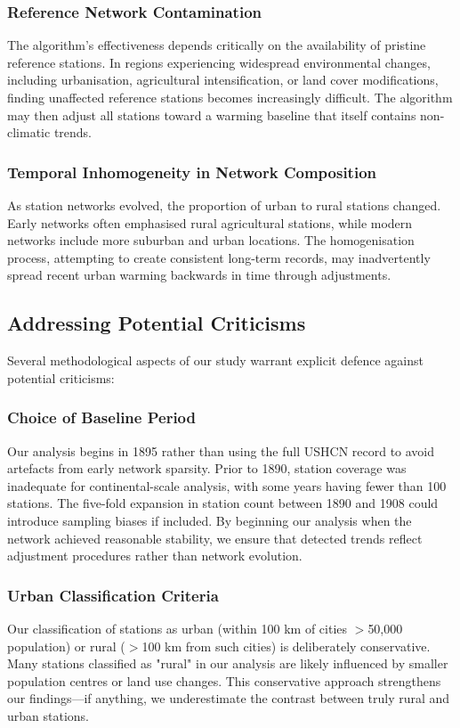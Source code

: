 \documentclass[11pt, a4paper]{article}
\begin{document}
\subsubsection{Reference Network Contamination}
The algorithm's effectiveness depends critically on the availability of pristine reference stations. In regions experiencing widespread environmental changes, including urbanisation, agricultural intensification, or land cover modifications, finding unaffected reference stations becomes increasingly difficult. The algorithm may then adjust all stations toward a warming baseline that itself contains non-climatic trends.

\subsubsection{Temporal Inhomogeneity in Network Composition}
As station networks evolved, the proportion of urban to rural stations changed. Early networks often emphasised rural agricultural stations, while modern networks include more suburban and urban locations. The homogenisation process, attempting to create consistent long-term records, may inadvertently spread recent urban warming backwards in time through adjustments.

\subsection{Addressing Potential Criticisms}

Several methodological aspects of our study warrant explicit defence against potential criticisms:

\subsubsection{Choice of Baseline Period}
Our analysis begins in 1895 rather than using the full USHCN record to avoid artefacts from early network sparsity. Prior to 1890, station coverage was inadequate for continental-scale analysis, with some years having fewer than 100 stations. The five-fold expansion in station count between 1890 and 1908 could introduce sampling biases if included. By beginning our analysis when the network achieved reasonable stability, we ensure that detected trends reflect adjustment procedures rather than network evolution.

\subsubsection{Urban Classification Criteria}
Our classification of stations as urban (within 100 km of cities $>$50,000 population) or rural ($>$100 km from such cities) is deliberately conservative. Many stations classified as "rural" in our analysis are likely influenced by smaller population centres or land use changes. This conservative approach strengthens our findings—if anything, we underestimate the contrast between truly rural and urban stations.
\end{document}
